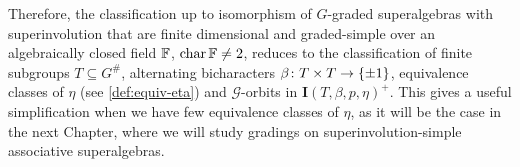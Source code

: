 Therefore, the classification up to isomorphism of $G$-graded superalgebras with superinvolution that are finite dimensional and graded-simple over an algebraically closed field $\mathbb{F}$, $\operatorname{char} \mathbb{F} \neq 2$, reduces to the classification of finite subgroups $T\subseteq G^\#$, alternating bicharacters $\beta\colon T\times T \to \{ \pm 1 \}$, equivalence classes of $\eta$ (see \cref{def:equiv-eta}) and $\mathcal G$-orbits in $\mathbf{I}(T,\beta, p, \eta)^+$.
This gives a useful simplification when we have few equivalence classes of $\eta$, as it will be the case in the next Chapter, where we will study gradings on superinvolution-simple associative superalgebras. 

